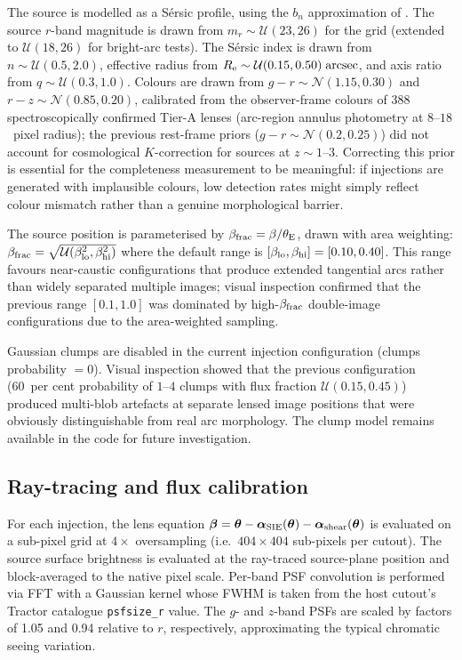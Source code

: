 \documentclass[fleqn,usenatbib]{rasti}
\begin{document}
The source is modelled as a S\'{e}rsic \citep{Sersic1968} profile, using the $b_n$ approximation of \citet{CiottiBertin1999}.  The source $r$-band magnitude is drawn from $m_r \sim \mathcal{U}(23, 26)$ for the grid (extended to $\mathcal{U}(18, 26)$ for bright-arc tests).  The S\'{e}rsic index is drawn from $n \sim \mathcal{U}(0.5, 2.0)$, effective radius from $R_{\rm e} \sim \mathcal{U}(0.15, 0.50)\;\mathrm{arcsec}$, and axis ratio from $q \sim \mathcal{U}(0.3, 1.0)$.  Colours are drawn from $g - r \sim \mathcal{N}(1.15, 0.30)$ and $r - z \sim \mathcal{N}(0.85, 0.20)$, calibrated from the observer-frame colours of 388 spectroscopically confirmed Tier-A lenses (arc-region annulus photometry at $8$--$18$~pixel radius); the previous rest-frame priors ($g - r \sim \mathcal{N}(0.2, 0.25)$) did not account for cosmological $K$-correction for sources at $z \sim 1$--$3$.  Correcting this prior is essential for the completeness measurement to be meaningful: if injections are generated with implausible colours, low detection rates might simply reflect colour mismatch rather than a genuine morphological barrier.

The source position is parameterised by $\beta_{\rm frac} = \beta / \theta_{\rm E}$, drawn with area weighting: $\beta_{\rm frac} = \sqrt{\mathcal{U}(\beta_{\rm lo}^{2}, \beta_{\rm hi}^{2})}$ where the default range is $[\beta_{\rm lo}, \beta_{\rm hi}] = [0.10, 0.40]$.  This range favours near-caustic configurations that produce extended tangential arcs rather than widely separated multiple images; visual inspection confirmed that the previous range $[0.1, 1.0]$ was dominated by high-$\beta_{\rm frac}$ double-image configurations due to the area-weighted sampling.

Gaussian clumps are disabled in the current injection configuration (clumps probability $= 0$).  Visual inspection showed that the previous configuration (60~per cent probability of $1$--$4$ clumps with flux fraction $\mathcal{U}(0.15, 0.45)$) produced multi-blob artefacts at separate lensed image positions that were obviously distinguishable from real arc morphology.  The clump model remains available in the code for future investigation.

\subsection{Ray-tracing and flux calibration}

For each injection, the lens equation $\boldsymbol{\beta} = \boldsymbol{\theta} - \boldsymbol{\alpha}_{\rm SIE}(\boldsymbol{\theta}) - \boldsymbol{\alpha}_{\rm shear}(\boldsymbol{\theta})$ is evaluated on a sub-pixel grid at $4\times$ oversampling (i.e.\ $404 \times 404$ sub-pixels per cutout).  The source surface brightness is evaluated at the ray-traced source-plane position and block-averaged to the native pixel scale.  Per-band PSF convolution is performed via FFT with a Gaussian kernel whose FWHM is taken from the host cutout's Tractor catalogue \texttt{psfsize\_r} value.  The $g$- and $z$-band PSFs are scaled by factors of 1.05 and 0.94 relative to $r$, respectively, approximating the typical chromatic seeing variation.
\end{document}
